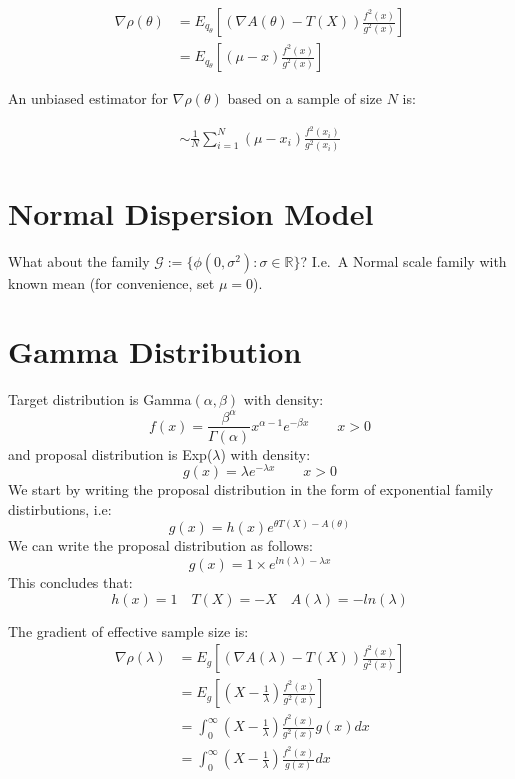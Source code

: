\documentclass{article}
\begin{document}
\begin{align*}
\nabla \rho(\theta) &= E_{q_{\theta}} \left[ (\nabla A(\theta) - T(X)) \frac{f^{2}(x)}{g^{2}(x)} \right] \\
                    &= E_{q_{\theta}} \left[ (\mu - x) \frac{f^{2}(x)}{g^{2}(x)} \right] 
\end{align*}

An unbiased estimator for $\nabla \rho(\theta)$ based on a sample of size $N$ is:

\begin{align*}
\sim \frac{1}{N} \sum_{i=1}^{N} (\mu-x_i) \frac{f^{2}(x_i)}{g^{2}(x_i)}
\end{align*}



\section{Normal Dispersion Model}

What about the family $\mathcal{G} := \{ \phi(0, \sigma^2) : \sigma \in \mathbb{R} \}$? I.e.\ A Normal scale family with known mean (for convenience, set $\mu = 0$).


\section{Gamma Distribution}
Target distribution is Gamma$(\alpha,\beta)$ with density:
$$f(x) = \frac{\beta^\alpha}{\Gamma(\alpha)} x^{\alpha-1} e^{-\beta x} \quad \quad x>0$$
and proposal distribution is Exp($\lambda$) with density:
$$g(x)=\lambda e^{-\lambda x} \quad \quad x>0$$
We start by writing the proposal distribution in the form of exponential family distirbutions, i.e: 
$$g(x) = h(x) e^{\theta T(X) - A(\theta)}$$
We can write the proposal distribution as follows:
$$g(x)=1 \times e^{ln(\lambda)-\lambda x}$$
This concludes that:
$$h(x)=1 \quad T(X) = -X \quad A(\lambda)=-ln(\lambda)$$

The gradient of effective sample size is:
\begin{align*}
\nabla \rho(\lambda) &= E_{g} \left[ (\nabla A(\lambda) - T(X) ) \frac{f^{2}(x)}{g^{2}(x)} \right] \\
&= E_{g} \left[ (X - \frac{1}{\lambda})  \frac{f^{2}(x)}{g^{2}(x)} \right] \\
&= \int_{0}^{\infty} (X - \frac{1}{\lambda}) \frac{f^{2}(x)}{g^{2}(x)} g(x) dx \\
&= \int_{0}^{\infty} (X - \frac{1}{\lambda}) \frac{f^{2}(x)}{g(x)} dx 
\end{align*}
\end{document}
